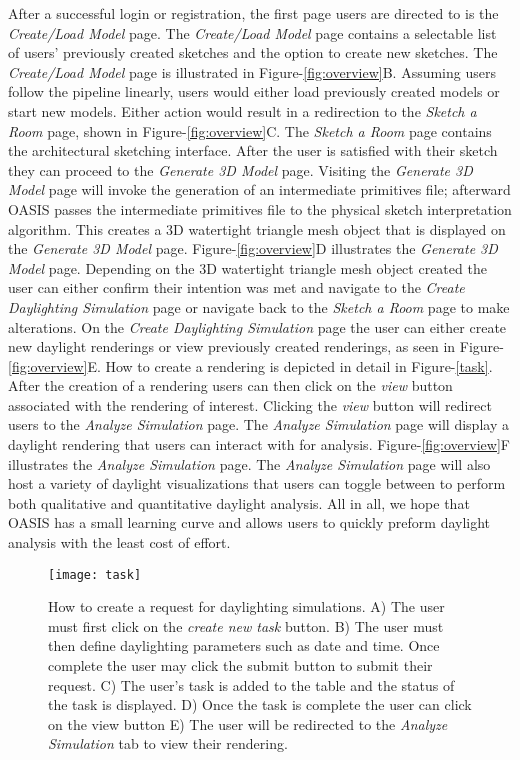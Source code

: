 After a successful login or registration, the first page users are directed to is the \textit{Create/Load Model} page.
The \textit{Create/Load Model} page contains a selectable list of users' previously created sketches and the option to create new sketches.
The \textit{Create/Load Model} page is illustrated in Figure-\ref{fig:overview}B.
Assuming users follow the pipeline linearly, users would either load previously created models or start new models.
Either action would result in a redirection to the \textit{Sketch a Room} page, shown in Figure-\ref{fig:overview}C.
The \textit{Sketch a Room} page contains the architectural sketching interface.
After the user is satisfied with their sketch they can proceed to the \textit{Generate 3D Model} page.
Visiting the \textit{Generate 3D Model} page will invoke the generation of an intermediate primitives file; afterward OASIS passes the intermediate primitives file to the physical sketch interpretation algorithm. This creates a 3D watertight triangle mesh object that is displayed on the \textit{Generate 3D Model} page.
Figure-\ref{fig:overview}D illustrates the \textit{Generate 3D Model} page.
Depending on the 3D watertight triangle mesh object created the user can either confirm their intention was met and navigate to the \textit{Create Daylighting Simulation} page or navigate back to the \textit{Sketch a Room} page to make alterations.
On the \textit{Create Daylighting Simulation} page the user can either create new daylight renderings or view previously created renderings, as seen in Figure-\ref{fig:overview}E.
How to create a rendering is depicted in detail in Figure-\ref{task}.
After the creation of a rendering users can then click on the \textit{view} button associated with the rendering of interest.
Clicking the \textit{view} button will redirect users to the \textit{Analyze Simulation} page.
The \textit{Analyze Simulation} page will display a daylight rendering that users can interact with for analysis.
Figure-\ref{fig:overview}F illustrates the \textit{Analyze Simulation} page.
The \textit{Analyze Simulation} page will also host a variety of daylight visualizations that users can toggle between to perform both qualitative and quantitative daylight analysis.
All in all, we hope that OASIS has a small learning curve and allows users to quickly preform daylight analysis with the least cost of effort.


\begin{figure}[!ht]
\centering
\caption[How to create a request for daylighting simulations.]{How to create a request for daylighting simulations. 
A) The user must first click on the \textit{create new task} button.
B) The user must then define daylighting parameters such as date and time. Once complete the user may click the submit button to submit their request.
C) The user's task is added to the table and the status of the task is displayed.
D) Once the task is complete the user can click on the view button
E) The user will be redirected to the \textit{Analyze Simulation} tab to view their rendering.
}
\label{fig:task}
\texttt{[image: task]}
\end{figure}

